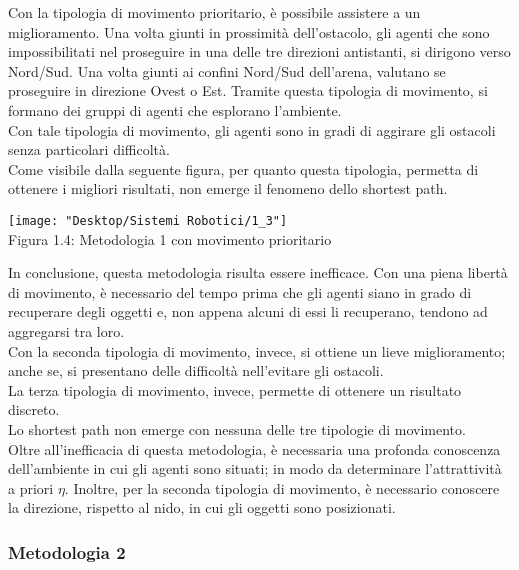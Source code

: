 \documentclass[12pt,a4paper,openright,twoside]{report}
\begin{document}
Con la tipologia di movimento prioritario, è possibile assistere a un miglioramento. Una volta giunti in prossimità dell'ostacolo, gli agenti che sono impossibilitati nel proseguire in una delle tre direzioni antistanti, si dirigono verso Nord/Sud. Una volta giunti ai confini Nord/Sud dell'arena, valutano se proseguire in direzione Ovest o Est. Tramite questa tipologia di movimento, si formano dei gruppi di agenti che esplorano l'ambiente.\\
Con tale tipologia di movimento, gli agenti sono in gradi di aggirare gli ostacoli senza particolari difficoltà.\\
Come visibile dalla seguente figura, per quanto questa tipologia, permetta di ottenere i migliori risultati, non emerge il fenomeno dello shortest path.\\

\begin{center}  
	\texttt{[image: "Desktop/Sistemi Robotici/1\_3"]}
	\\Figura 1.4: Metodologia 1 con movimento prioritario
\end{center}

In conclusione, questa metodologia risulta essere inefficace. Con una piena libertà di movimento, è necessario del tempo prima che gli agenti siano in grado di recuperare degli oggetti e, non appena alcuni di essi li recuperano, tendono ad aggregarsi tra loro.\\ Con la seconda tipologia di movimento, invece, si ottiene un lieve miglioramento; anche se, si presentano delle difficoltà nell'evitare gli ostacoli.\\La terza tipologia di movimento, invece, permette di ottenere un risultato discreto.\\
Lo shortest path non emerge con nessuna delle tre tipologie di movimento.\\
Oltre all'inefficacia di questa metodologia, è necessaria una profonda conoscenza dell'ambiente in cui gli agenti sono situati; in modo da determinare l'attrattività a priori $\eta$. Inoltre, per la seconda tipologia di movimento, è necessario conoscere la direzione, rispetto al nido, in cui gli oggetti sono posizionati.

\subsubsection{Metodologia 2}
\end{document}
